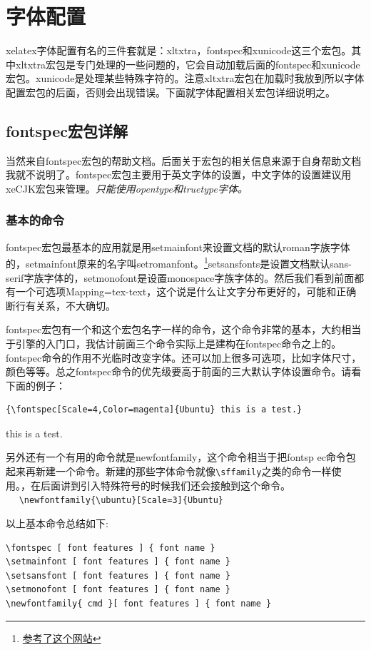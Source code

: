 \documentclass[11pt,oneside]{book}
\begin{document}
\chapter{字体配置}
xelatex字体配置有名的三件套就是：xltxtra，fontspec和xunicode这三个宏包。其中xltxtra宏包是专门处理\XeLaTeX 的一些问题的，它会自动加载后面的fontspec和xunicode宏包。xunicode是处理某些特殊字符的。注意xltxtra宏包在加载时我放到所以字体配置宏包的后面，否则会出现错误。下面就字体配置相关宏包详细说明之。


\section{fontspec宏包详解}
当然来自fontspec宏包的帮助文档。后面关于宏包的相关信息来源于自身帮助文档我就不说明了。fontspec宏包主要用于英文字体的设置，中文字体的设置建议用xeCJK宏包来管理。\emph{\XeLaTeX 只能使用opentype和truetype字体。}

\subsection{基本的命令}
fontspec宏包最基本的应用就是用setmainfont来设置文档的默认roman字族字体的，setmainfont原来的名字叫setromanfont。\footnote{\href{http://tex.stackexchange.com/questions/70413/problem-with-xetex-latex-and-system-fonts}{参考了这个网站}}setsansfonts是设置文档默认sans-serif字族字体的，setmonofont是设置monospace字族字体的。然后我们看到前面都有一个可选项Mapping=tex-text，这个说是什么让\XeTeX 文字分布更好的，可能和正确断行有关系，不大确切。

fontspec宏包有一个和这个宏包名字一样的命令，这个命令非常的基本，大约相当于引擎的入门口，我估计前面三个命令实际上是建构在fontspec命令之上的。fontspec命令的作用不光临时改变字体。还可以加上很多可选项，比如字体尺寸，颜色等等。总之fontspec命令的优先级要高于前面的三大默认字体设置命令。请看下面的例子：
\begin{Verbatim}
{\fontspec[Scale=4,Color=magenta]{Ubuntu} this is a test.} 
\end{Verbatim}
{ this is a test.} 

另外还有一个有用的命令就是newfontfamily，这个命令相当于把fontsp\- ec命令包起来再新建一个命令。新建的那些字体命令就像\verb+\sffamily+之类的命令一样使用。，在后面讲到引入特殊符号的时候我们还会接触到这个命令。\\　
\verb+\newfontfamily{\ubuntu}[Scale=3]{Ubuntu}+

以上基本命令总结如下:
\begin{Verbatim}
\fontspec [ font features ] { font name }
\setmainfont [ font features ] { font name }
\setsansfont [ font features ] { font name }
\setmonofont [ font features ] { font name }
\newfontfamily{ cmd }[ font features ] { font name }
\end{Verbatim}
\end{document}
